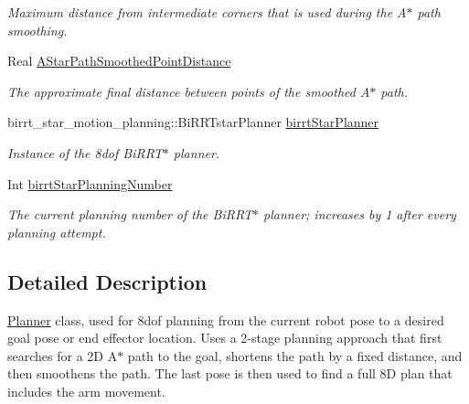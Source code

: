 \begin{DoxyCompactItemize}
\begin{DoxyCompactList}\small\item\em Maximum distance from intermediate corners that is used during the A$\ast$ path smoothing. \end{DoxyCompactList}\item 
\hypertarget{classSquirrelMotionPlanner_1_1Planner_afe3217a29a166cac2e0e7922e406da59}{Real \hyperlink{classSquirrelMotionPlanner_1_1Planner_afe3217a29a166cac2e0e7922e406da59}{A\-Star\-Path\-Smoothed\-Point\-Distance}}\label{classSquirrelMotionPlanner_1_1Planner_afe3217a29a166cac2e0e7922e406da59}

\begin{DoxyCompactList}\small\item\em The approximate final distance between points of the smoothed A$\ast$ path. \end{DoxyCompactList}\item 
\hypertarget{classSquirrelMotionPlanner_1_1Planner_a2413e0d4242e976e8ba1ed2a11110edd}{birrt\-\_\-star\-\_\-motion\-\_\-planning\-::\-Bi\-R\-R\-Tstar\-Planner \hyperlink{classSquirrelMotionPlanner_1_1Planner_a2413e0d4242e976e8ba1ed2a11110edd}{birrt\-Star\-Planner}}\label{classSquirrelMotionPlanner_1_1Planner_a2413e0d4242e976e8ba1ed2a11110edd}

\begin{DoxyCompactList}\small\item\em Instance of the 8dof Bi\-R\-R\-T$\ast$ planner. \end{DoxyCompactList}\item 
\hypertarget{classSquirrelMotionPlanner_1_1Planner_af516201f114a1d0cbd04447c240a38ae}{Int \hyperlink{classSquirrelMotionPlanner_1_1Planner_af516201f114a1d0cbd04447c240a38ae}{birrt\-Star\-Planning\-Number}}\label{classSquirrelMotionPlanner_1_1Planner_af516201f114a1d0cbd04447c240a38ae}

\begin{DoxyCompactList}\small\item\em The current planning number of the Bi\-R\-R\-T$\ast$ planner; increases by 1 after every planning attempt. \end{DoxyCompactList}\end{DoxyCompactItemize}


\subsection{Detailed Description}
\hyperlink{classSquirrelMotionPlanner_1_1Planner}{Planner} class, used for 8dof planning from the current robot pose to a desired goal pose or end effector location. Uses a 2-\/stage planning approach that first searches for a 2\-D A$\ast$ path to the goal, shortens the path by a fixed distance, and then smoothens the path. The last pose is then used to find a full 8\-D plan that includes the arm movement. 

